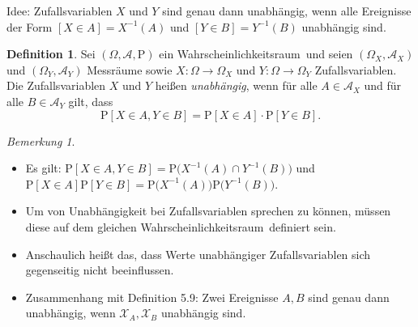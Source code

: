 \documentclass[a4paper,12pt,fleqn]{scrartcl}
\newcommand{\m}[1]{\mathcal{ #1 }}
\newcommand{\p}[1]{\text{P(} #1 \text{)}}
\newcommand{\WR}{Wahrscheinlichkeitsraum}
\newcommand{\ZV}{Zufallsvariable}
\theoremstyle{definition}
\newtheorem{definition}{Definition}[section]
\theoremstyle{plain}
\theoremstyle{remark}
\newtheorem*{bemerkung}{Bemerkung}
\begin{document}
Idee: \ZV n $X$ und $Y$ sind genau dann unabhängig, wenn alle Ereignisse der Form  $[X \in A] = X^{-1}(A) $ und $[Y \in B] = Y^{-1}(B)$ unabhängig sind.
\begin{definition}
Sei $( \Omega , \m{A} , \text{P})$ ein \WR \, und seien $ ( \Omega_X , \m{A}_X )$ und $(\Omega_Y , \m{A}_Y ) $ Messräume sowie $X: \Omega \rightarrow \Omega_X$ und $Y: \Omega \rightarrow \Omega_Y$ \ZV n. Die \ZV n $X$ und $Y$ heißen \emph{unabhängig}, wenn für alle $A \in \m{A}_X$ und für alle $B \in \m{A}_Y$ gilt, dass
\[\text{P}[X \in A, Y \in B]= \text{P}[X \in A] \cdot \text{P}[Y \in B].\]
\end{definition}
\begin{bemerkung}
\begin{itemize}
\item Es gilt: $\text{P}[X \in A , Y \in B] = \p{X^{-1}(A) \cap Y^{-1}(B)} $ und $ \text{P}[X \in A]\text{P}[ Y \in B ] = \p{X^{-1}(A)}\p{Y^{-1}(B)} $.
\item Um von Unabhängigkeit bei Zufallsvariablen sprechen zu können, müssen diese auf dem gleichen \WR \, definiert sein.
\item Anschaulich heißt das, dass Werte unabhängiger Zufallsvariablen sich gegenseitig nicht beeinflussen.
\item Zusammenhang mit Definition 5.9: Zwei Ereignisse $A, B$ sind genau dann unabhängig, wenn $\m{X}_A, \m{X}_B$ unabhängig sind. 
\end{itemize}
\end{bemerkung}
\end{document}
